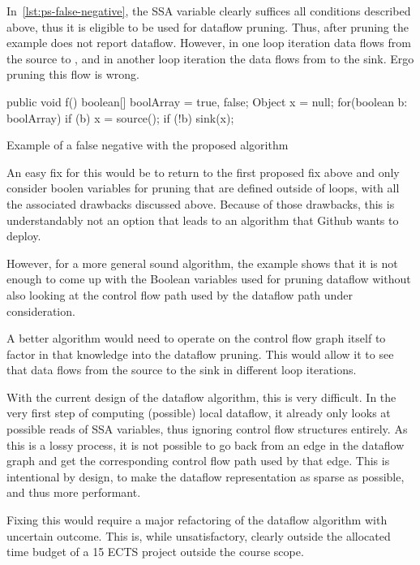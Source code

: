 In~\autoref{lst:ps-false-negative}, the SSA variable  clearly
suffices all conditions described above, thus it is eligible to be used for 
dataflow pruning.
Thus, after pruning the example does not report dataflow.
However, in one loop iteration data flows from the source to ,
and in another loop iteration the data flows from  to the sink.
Ergo pruning this flow is wrong.

\begin{listing}[h]
    \begin{javacode}
public void f() {
    boolean[] boolArray = {true, false};
    Object x = null;
    for(boolean b: boolArray) {
        if (b) {
            x = source();
        }
        if (!b) {
            sink(x);
        }
    }
}
    \end{javacode}
    \caption{Example of a false negative with the proposed algorithm}
    \label{lst:ps-false-negative}
\end{listing}

An easy fix for this would be to return to the first proposed fix above and
only consider boolen variables for pruning that are defined outside of loops,
with all the associated drawbacks discussed above.
Because of those drawbacks, this is understandably
not an option that leads to an algorithm that Github wants to deploy.

However, for a more general sound algorithm, the example shows that it is not enough
to come up with the Boolean variables used for pruning dataflow without also 
looking at the control flow path used by the dataflow path under consideration.

A better algorithm would need to operate on the control flow graph itself to
factor in that knowledge into the dataflow pruning.
This would allow it to see that data flows from the source to the sink in different 
loop iterations.

With the current design of the dataflow algorithm, this is very difficult.
In the very first step of computing (possible) local dataflow, it already 
only looks at possible reads of SSA variables, thus ignoring control flow structures
entirely.
As this is a lossy process, it is not possible to go back from an edge in the
dataflow graph and get the corresponding control flow path used by that edge.
This is intentional by design, to make the dataflow representation as sparse 
as possible, and thus more performant.

Fixing this would require a major refactoring of the dataflow algorithm with 
uncertain outcome.
This is, while unsatisfactory, clearly outside the allocated time budget
of a 15 ECTS project outside the course scope.






